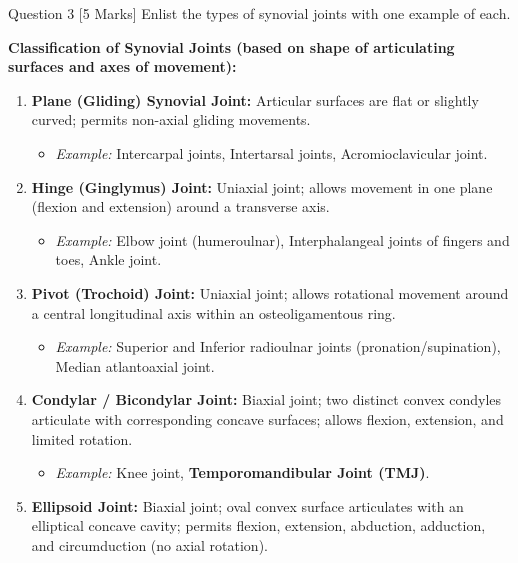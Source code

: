 \documentclass[11pt,a4paper]{article}
\begin{document}
\begin{qbox}{Question 3 [5 Marks]}
Enlist the types of synovial joints with one example of each.
\end{qbox}

\begin{ansbox}
\textbf{Classification of Synovial Joints (based on shape of articulating surfaces and axes of movement):}
\begin{enumerate}[leftmargin=*]
    \item \textbf{Plane (Gliding) Synovial Joint:} Articular surfaces are flat or slightly curved; permits non-axial gliding movements.
    \begin{itemize}
        \item \textit{Example:} Intercarpal joints, Intertarsal joints, Acromioclavicular joint.
    \end{itemize}
    \item \textbf{Hinge (Ginglymus) Joint:} Uniaxial joint; allows movement in one plane (flexion and extension) around a transverse axis.
    \begin{itemize}
        \item \textit{Example:} Elbow joint (humeroulnar), Interphalangeal joints of fingers and toes, Ankle joint.
    \end{itemize}
    \item \textbf{Pivot (Trochoid) Joint:} Uniaxial joint; allows rotational movement around a central longitudinal axis within an osteoligamentous ring.
    \begin{itemize}
        \item \textit{Example:} Superior and Inferior radioulnar joints (pronation/supination), Median atlantoaxial joint.
    \end{itemize}
    \item \textbf{Condylar / Bicondylar Joint:} Biaxial joint; two distinct convex condyles articulate with corresponding concave surfaces; allows flexion, extension, and limited rotation.
    \begin{itemize}
        \item \textit{Example:} Knee joint, \textbf{Temporomandibular Joint (TMJ)}.
    \end{itemize}
    \item \textbf{Ellipsoid Joint:} Biaxial joint; oval convex surface articulates with an elliptical concave cavity; permits flexion, extension, abduction, adduction, and circumduction (no axial rotation).
    \begin{itemize}

\end{itemize}
\end{enumerate}
\end{ansbox}
\end{document}
